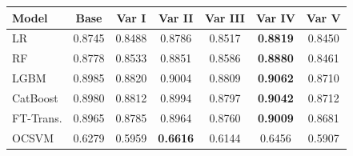 \begin{tabular}{l c c c c c c}
\toprule
Model & Base & Var I & Var II & Var III & Var IV & Var V \\
\midrule
LR         & 0.8745 & 0.8488 & 0.8786 & 0.8517 & \textbf{0.8819} & 0.8450 \\
RF         & 0.8778 & 0.8533 & 0.8851 & 0.8586 & \textbf{0.8880} & 0.8461 \\
LGBM       & 0.8985 & 0.8820 & 0.9004 & 0.8809 & \textbf{0.9062} & 0.8710 \\
CatBoost   & 0.8980 & 0.8812 & 0.8994 & 0.8797 & \textbf{0.9042} & 0.8712 \\
FT-Trans.  & 0.8965 & 0.8785 & 0.8964 & 0.8760 & \textbf{0.9009} & 0.8681 \\
OCSVM      & 0.6279 & 0.5959 & \textbf{0.6616} & 0.6144 & 0.6456 & 0.5907 \\
\bottomrule
\end{tabular}
